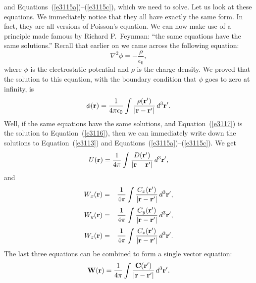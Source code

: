 and Equations~(\ref{e3115a})--(\ref{e3115c}),  which
we need to solve. Let us look at these equations. We immediately notice that
they all have exactly the same form. In fact, they are all versions of Poisson's
equation. We can now make use of a principle made famous by Richard P.\ Feynman:
``the same equations have the same solutions.'' Recall that earlier on we 
came across the following equation:
\begin{equation}\label{e3116}
\nabla^2\phi = -\frac{\rho}{\epsilon_0},
\end{equation}
where $\phi$ is the electrostatic potential and $\rho$ is the charge density.
We proved that the solution to this equation, with the boundary condition that
$\phi$ goes to zero at infinity, is
\begin{equation}\label{e3117}
\phi({\bf r} ) = \frac{1}{4\pi \epsilon_0} \int\frac{\rho({\bf r'})}
{|{\bf r} - {\bf r'}|}\,d^3{\bf r'}.
\end{equation}
Well, if the same equations have the same solutions, and Equation~(\ref{e3117}) is the solution
to Equation~(\ref{e3116}), then we can immediately write down the solutions to
Equation~(\ref{e3113}) and Equations~(\ref{e3115a})--(\ref{e3115c}). We get
\begin{equation}\label{e3118}
U({\bf r} ) = \frac{1}{4\pi } \int\frac{D({\bf r'})}
{|{\bf r} - {\bf r'}|}\,d^3{\bf r'},
\end{equation}
and
\begin{eqnarray}
W_x({\bf r} ) &=& \frac{1}{4\pi } \int\frac{C_x({\bf r'})}
{|{\bf r} - {\bf r'}|}\,d^3{\bf r'},\\[0.5ex]
W_y({\bf r} ) &=& \frac{1}{4\pi } \int\frac{C_y({\bf r'})}
{|{\bf r} - {\bf r'}|}\,d^3{\bf r'},\\[0.5ex]
W_z({\bf r} ) &=& \frac{1}{4\pi } \int\frac{C_z({\bf r'})}
{|{\bf r} - {\bf r'}|}\,d^3{\bf r'}.
\end{eqnarray}
The last three equations can be combined to form a single vector equation:
\begin{equation}\label{e3120}
{\bf W} ({\bf r})= \frac{1}{4\pi } \int\frac{{\bf C}({\bf r'})}
{|{\bf r} - {\bf r'}|}\,d^3{\bf r'}.
\end{equation}

